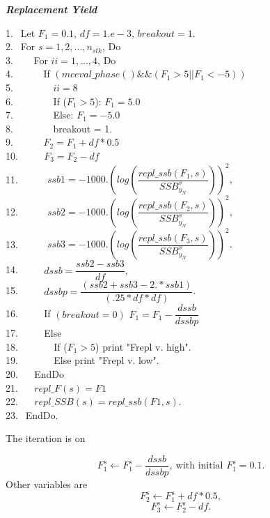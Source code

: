 \documentclass{article}
\begin{document}
\begin{algorithm}
	\caption{{\bf \textit{Replacement Yield}}}
	1.  $\  \ $Let $F_1=0.1$, $df=1.e-3$, $breakout=1$. \\
	2.  $\  \ $For $s=1,2,...,n_{stk}$, Do\\
    3.  $\  \ \quad$ For $ii=1,...,4$, Do \\
	4.  $\  \ \qquad$ If $(mceval\_phase()\&\&(F_1>5||F_1< -5)) $\\
	5.  $\  \ \qquad$$\quad$ $ii=8$\\
	6.  $\  \ \qquad$$\quad$  If ($F_1>5$): $F_1=5.0$\\
	7.  $\  \ \qquad$$\quad$   Else: $F_1=-5.0$\\
	8.  $\  \ \qquad$$\quad$   breakout = 1. \\
	9.  $\  \ \qquad$   $F_2 = F_1+df*0.5$\\
	10. $\qquad$  $F_3 = F_2 -df$\\
	11. $\quad$ $\quad$  $ssb1=-1000.\left(log\left(\dfrac{repl\_ssb(F_1,s)}{SSB^s_{y_N}}\right)\right)^2,$\\
    12. $\quad$ $\quad$  $ssb2=-1000.\left(log\left(\dfrac{repl\_ssb(F_2,s)}{SSB^s_{y_N}}\right)\right)^2,$\\
    13. $\quad$ $\quad$  $ssb3=-1000.\left(log\left(\dfrac{repl\_ssb(F_3,s)}{SSB^s_{y_N}}\right)\right)^2.$\\
    14. $\quad$$\quad$   $dssb   = \dfrac{ssb2 - ssb3}{df},$\\
    15. $\quad$$\quad$   $dssbp  = \dfrac{(ssb2 + ssb3 - 2.*ssb1)}{(.25*df*df)}$.\\
    16. $\quad$$\quad$   If $(breakout=0)$ $F_1=F_{1}-\dfrac{dssb}{dssbp}$\\
    17. $\quad$$\quad$   Else \\
    18. $\qquad$$\quad$   If ($F_1>5$) print "Frepl v. high". \\
    19. $\qquad$$\quad$   Else print "Frepl v. low". \\
    20. $\quad$ EndDo\\
    21. $\quad$ $repl\_F(s) = F1$\\
    22. $\quad$ $repl\_SSB(s) = repl\_ssb(F1,s)$.\\
    23. $\  \ $EndDo.
    
\end{algorithm}

The iteration is on

\begin{equation}
    F_{1}^s\leftarrow F_{1}^s-\dfrac{dssb}{dssbp}, \ \text{with initial $F_{1}^s=0.1$}.
\end{equation}
Other variables are
\begin{equation}
    F_2^s \leftarrow F_1^s+df*0.5,
\end{equation}
\begin{equation}
    F_3^s \leftarrow F_2^s -df.
\end{equation}
\end{document}
